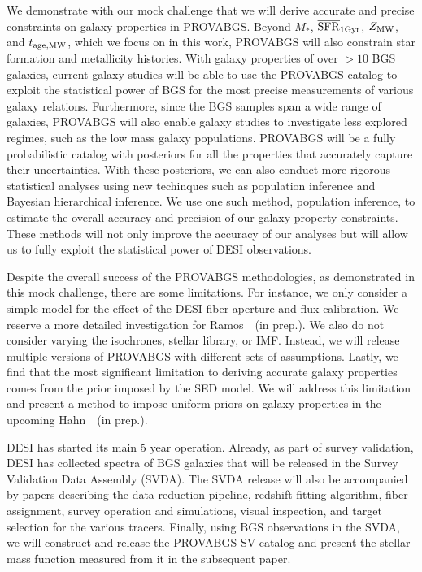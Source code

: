 We demonstrate with our mock challenge that we will derive accurate and precise
constraints on galaxy properties in PROVABGS. 
Beyond $M_*$, $\overline{\rm SFR}_{\rm 1Gyr}$, $Z_{\rm MW}$, and $t_{\rm age, MW}$, which we focus on in this work, 
PROVABGS will also constrain star formation and metallicity histories. 
With galaxy properties of over ${>}10$ BGS galaxies, current galaxy studies
will be able to use the PROVABGS catalog to exploit the statistical power of
BGS for the most precise measurements of various galaxy relations. 
Furthermore, since the BGS samples span a wide range of galaxies, PROVABGS will
also enable galaxy studies to investigate less explored regimes, such as the
low mass galaxy populations. 
PROVABGS will be a fully probabilistic catalog with posteriors for all the
properties that accurately capture their uncertainties.
With these posteriors, we can also conduct more rigorous statistical analyses
using new techinques such as population inference and Bayesian hierarchical
inference.
We use one such method, population inference, to estimate the overall accuracy
and precision of our galaxy property constraints. 
These methods will not only improve the accuracy of our analyses but will allow
us to fully exploit the statistical power of DESI observations. 

Despite the overall success of the PROVABGS methodologies, as demonstrated in
this mock challenge, there are some limitations. 
For instance, we only consider a simple model for the effect of the DESI fiber
aperture and flux calibration. 
We reserve a more detailed investigation for Ramos~\etal~(in prep.). 
We also do not consider varying the isochrones, stellar library, or IMF. 
Instead, we will release multiple versions of PROVABGS with different sets of
assumptions. 
Lastly, we find that the most significant limitation to deriving accurate
galaxy properties comes from the prior imposed by the SED model. 
We will address this limitation and present a method to impose uniform priors
on galaxy properties in the upcoming Hahn~\etal~(in prep.). 

DESI has started its main 5 year operation. 
Already, as part of survey validation, DESI has collected  spectra of
BGS galaxies that will be released in the Survey Validation Data Assembly
(SVDA). 
The SVDA release will also be accompanied by papers describing the data
reduction pipeline, redshift fitting algorithm, fiber assignment, survey
operation and simulations, visual inspection, and target selection for the
various tracers. 
Finally, using BGS observations in the SVDA, we will construct and release the
PROVABGS-SV catalog and present the stellar mass function measured from it in
the subsequent paper. 
